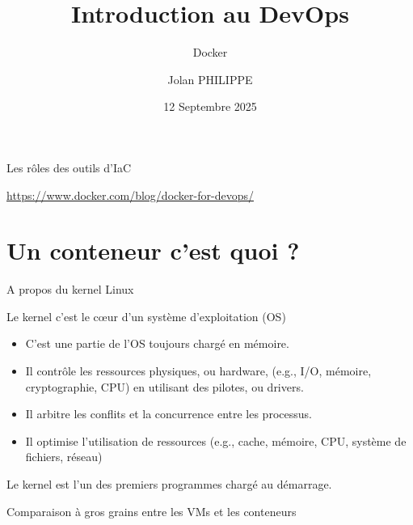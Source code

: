 \documentclass[aspectratio=169,10pt]{beamer}
\title{Introduction au DevOps}
\subtitle{Docker}
\date{12 Septembre 2025}
\author{Jolan PHILIPPE}
\institute{Université d'Orléans}
\begin{document}
\begin{frame}
    \titlepage 
\end{frame}

\begin{frame}{Les rôles des outils d'IaC}

\hspace*{-0.7cm}


\url{https://www.docker.com/blog/docker-for-devops/}

\end{frame}

\section{Un conteneur c'est quoi ?}


\begin{frame}{A propos du kernel Linux}

Le kernel c'est le cœur d'un système d'exploitation (OS)

\begin{itemize}
    \item C'est une partie de l'OS toujours chargé en mémoire.
    \item Il contrôle les ressources physiques, ou hardware, (e.g., I/O, mémoire, cryptographie, CPU) en utilisant des pilotes, ou drivers.
    \item Il arbitre les conflits et la concurrence entre les processus.
    \item Il optimise l'utilisation de ressources (e.g., cache, mémoire, CPU, système de fichiers, réseau)
\end{itemize}

Le kernel est l'un des premiers programmes chargé au démarrage.

\end{frame}


\begin{frame}{Comparaison à gros grains entre les VMs et les conteneurs}



\end{frame}

\end{document}
